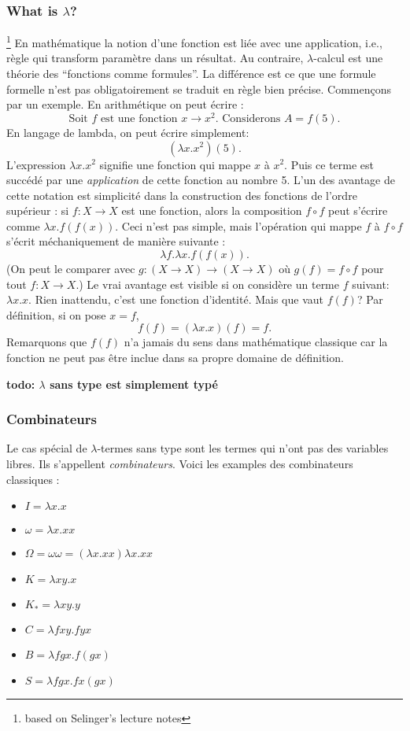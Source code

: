 \documentclass[12pt, a4paper]{article}
\begin{document}
\subsubsection*{What is $\lambda$?}\footnote{based on Selinger's lecture notes}
En mathématique la notion d'une fonction est liée avec une application, i.e., règle qui transform paramètre dans un résultat.
Au contraire, $\lambda$-calcul est une théorie des ``fonctions comme formules''. La différence est ce que une formule formelle n'est pas obligatoirement se traduit en règle bien précise.
Commençons par un exemple.
En arithmétique on peut écrire : 
$$\text{Soit $f$ est une fonction $x \to x^2$. Considerons $A = f(5)$.}$$
En langage de lambda, on peut écrire simplement: $$(\lambda x.x^2) (5).$$
L'expression $\lambda x.x^2$ signifie une fonction qui mappe $x$ à $x^2$.
Puis ce terme est succédé par une \emph{application} de cette fonction au nombre 5.
L'un des avantage de cette notation est simplicité dans la construction des fonctions de l'ordre supérieur : si $f: X \to X$ est une fonction, alors la composition $f \circ f$ peut s'écrire comme $\lambda x.f(f(x))$.
Ceci n'est pas simple, mais l'opération qui mappe $f$ à $f \circ f$ s'écrit méchaniquement de manière suivante :
$$\lambda f. \lambda x.f(f(x)).$$
(On peut le comparer avec $g: (X \to X) \to (X \to X)$ où $g(f) = f \circ f$ pour tout $f: X \to X$.)
Le vrai avantage est visible si on considère un terme $f$ suivant: $\lambda x.x$.
Rien inattendu, c'est une fonction d'identité.
Mais que vaut $f(f)$?
Par définition, si on pose $x = f$,
$$f(f) = (\lambda x.x)(f) = f.$$
Remarquons que $f(f)$ n'a jamais du sens dans mathématique classique car la fonction ne peut pas être inclue dans sa propre domaine de définition.

\textbf{todo: $\lambda$ sans type est simplement typé}

\subsubsection*{Combinateurs}
Le cas spécial de $\lambda$-termes sans type sont les termes qui n'ont pas des variables libres. Ils s'appellent \emph{combinateurs}.
Voici les examples des combinateurs classiques :
\begin{itemize}
	\item $I = \lambda x. x$
	\item $\omega = \lambda x. xx$
	\item $\Omega = \omega \omega = (\lambda x. xx) \lambda x. xx$
	\item $K = \lambda x y. x$
	\item $K_* = \lambda x y. y$
	\item $C = \lambda fxy. fyx$
	\item $B = \lambda fgx. f(gx)$
	\item $S = \lambda fgx. fx(gx)$
\end{itemize}
\end{document}
